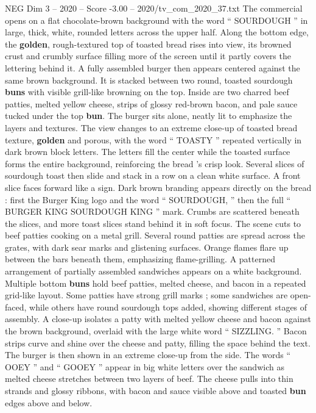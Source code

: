 \begin{textsample}{NEG Dim 3 – 2020 – Score -3.00 – 2020/tv\_com\_2020\_37.txt}  \label{ex:f3_neg_030}
The commercial opens on a flat chocolate-brown background with the word “ SOURDOUGH ” in large, thick, white, rounded letters across the upper half.
Along the bottom edge, the \textbf{golden}, rough-textured top of toasted bread rises into view, its browned crust and crumbly surface filling more of the screen until it partly covers the lettering behind it.
A fully assembled burger then appears centered against the same brown background.
It is stacked between two round, toasted sourdough \textbf{buns} with visible grill-like browning on the top.
Inside are two charred beef patties, melted yellow cheese, strips of glossy red-brown bacon, and pale sauce tucked under the top \textbf{bun}.
The burger sits alone, neatly lit to emphasize the layers and textures.
The view changes to an extreme close-up of toasted bread texture, \textbf{golden} and porous, with the word “ TOASTY ” repeated vertically in dark brown block letters.
The letters fill the center while the toasted surface forms the entire background, reinforcing the bread ’s crisp look.
Several slices of sourdough toast then slide and stack in a row on a clean white surface.
A front slice faces forward like a sign.
Dark brown branding appears directly on the bread : first the Burger King logo and the word “ SOURDOUGH, ” then the full “ BURGER KING SOURDOUGH KING ” mark.
Crumbs are scattered beneath the slices, and more toast slices stand behind it in soft focus.
The scene cuts to beef patties cooking on a metal grill.
Several round patties are spread across the grates, with dark sear marks and glistening surfaces.
Orange flames flare up between the bars beneath them, emphasizing flame-grilling.
A patterned arrangement of partially assembled sandwiches appears on a white background.
Multiple bottom \textbf{buns} hold beef patties, melted cheese, and bacon in a repeated grid-like layout.
Some patties have strong grill marks ; some sandwiches are open-faced, while others have round sourdough tops added, showing different stages of assembly.
A close-up isolates a patty with melted yellow cheese and bacon against the brown background, overlaid with the large white word “ SIZZLING. ” Bacon strips curve and shine over the cheese and patty, filling the space behind the text.
The burger is then shown in an extreme close-up from the side.
The words “ OOEY ” and “ GOOEY ” appear in big white letters over the sandwich as melted cheese stretches between two layers of beef.
The cheese pulls into thin strands and glossy ribbons, with bacon and sauce visible above and toasted \textbf{bun} edges above and below.

\end{textsample}
